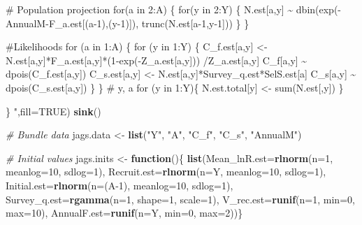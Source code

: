 \documentclass[
]{krantz}
\makeatletter
\newenvironment{Shaded}{\begin{snugshade}}{\end{snugshade}}
\newcommand{\AttributeTok}[1]{\textcolor[rgb]{0.27,0.27,0.27}{#1}}
\newcommand{\CommentTok}[1]{\textcolor[rgb]{0.37,0.37,0.37}{\textit{#1}}}
\newcommand{\ConstantTok}[1]{\textcolor[rgb]{0.37,0.37,0.37}{#1}}
\newcommand{\ControlFlowTok}[1]{\textcolor[rgb]{0.27,0.27,0.27}{\textbf{#1}}}
\newcommand{\DecValTok}[1]{\textcolor[rgb]{0.06,0.06,0.06}{#1}}
\newcommand{\FunctionTok}[1]{\textcolor[rgb]{0.27,0.27,0.27}{\textbf{#1}}}
\newcommand{\NormalTok}[1]{#1}
\newcommand{\OtherTok}[1]{\textcolor[rgb]{0.37,0.37,0.37}{#1}}
\newcommand{\StringTok}[1]{\textcolor[rgb]{0.5,0.5,0.5}{#1}}
\newenvironment{kframe}{%
\medskip{}
\setlength{\fboxsep}{.8em}
 \def\at@end@of@kframe{}%
 \ifinner\ifhmode%
  \def\at@end@of@kframe{\end{minipage}}%
  \begin{minipage}{\columnwidth}%
 \fi\fi%
 \def\FrameCommand##1{\hskip\@totalleftmargin \hskip-\fboxsep
 \colorbox{shadecolor}{##1}\hskip-\fboxsep
     \hskip-\linewidth \hskip-\@totalleftmargin \hskip\columnwidth}%
 \MakeFramed {\advance\hsize-\width
   \@totalleftmargin\z@ \linewidth\hsize
   \@setminipage}}%
 {\par\unskip\endMakeFramed%
 \at@end@of@kframe}
\renewenvironment{Shaded}{\begin{kframe}}{\end{kframe}}
\makeatother
\begin{document}
\begin{Shaded}
\begin{Highlighting}[]
\StringTok{    \# Population projection}
\StringTok{    for(a in 2:A) \{}
\StringTok{   for(y in 2:Y) \{}
\StringTok{     N.est[a,y] \textasciitilde{} dbin(exp({-}AnnualM{-}F\_a.est[(a{-}1),(y{-}1)]),}
\StringTok{                         trunc(N.est[a{-}1,y{-}1])) \} \}}

\StringTok{    \#Likelihoods}
\StringTok{    for (a in 1:A) \{}
\StringTok{   for (y in 1:Y) \{}
\StringTok{     C\_f.est[a,y] \textless{}{-} N.est[a,y]*F\_a.est[a,y]*(1{-}exp({-}Z\_a.est[a,y]))}
\StringTok{                      /Z\_a.est[a,y]}
\StringTok{     C\_f[a,y] \textasciitilde{} dpois(C\_f.est[a,y])}
\StringTok{     C\_s.est[a,y] \textless{}{-} N.est[a,y]*Survey\_q.est*SelS.est[a]}
\StringTok{     C\_s[a,y] \textasciitilde{} dpois(C\_s.est[a,y])}
\StringTok{   \} \} \# y, a}
\StringTok{   for (y in 1:Y)\{}
\StringTok{    N.est.total[y] \textless{}{-} sum(N.est[,y])}
\StringTok{   \}}

\StringTok{\}}
\StringTok{    "}\NormalTok{,}\AttributeTok{fill=}\ConstantTok{TRUE}\NormalTok{)}
\FunctionTok{sink}\NormalTok{()}

\CommentTok{\# Bundle data}
\NormalTok{jags.data }\OtherTok{\textless{}{-}} \FunctionTok{list}\NormalTok{(}\StringTok{"Y"}\NormalTok{, }\StringTok{"A"}\NormalTok{, }\StringTok{"C\_f"}\NormalTok{, }\StringTok{"C\_s"}\NormalTok{, }\StringTok{"AnnualM"}\NormalTok{)}

\CommentTok{\# Initial values}
\NormalTok{jags.inits }\OtherTok{\textless{}{-}} \ControlFlowTok{function}\NormalTok{()\{ }\FunctionTok{list}\NormalTok{(}\AttributeTok{Mean\_lnR.est=}\FunctionTok{rlnorm}\NormalTok{(}\AttributeTok{n=}\DecValTok{1}\NormalTok{, }\AttributeTok{meanlog=}\DecValTok{10}\NormalTok{, }
                                                   \AttributeTok{sdlog=}\DecValTok{1}\NormalTok{),}
                               \AttributeTok{Recruit.est=}\FunctionTok{rlnorm}\NormalTok{(}\AttributeTok{n=}\NormalTok{Y, }\AttributeTok{meanlog=}\DecValTok{10}\NormalTok{, }
                                                  \AttributeTok{sdlog=}\DecValTok{1}\NormalTok{),}
                               \AttributeTok{Initial.est=}\FunctionTok{rlnorm}\NormalTok{(}\AttributeTok{n=}\NormalTok{(A}\DecValTok{{-}1}\NormalTok{), }\AttributeTok{meanlog=}\DecValTok{10}\NormalTok{, }
                                                  \AttributeTok{sdlog=}\DecValTok{1}\NormalTok{),}
                               \AttributeTok{Survey\_q.est=}\FunctionTok{rgamma}\NormalTok{(}\AttributeTok{n=}\DecValTok{1}\NormalTok{, }\AttributeTok{shape=}\DecValTok{1}\NormalTok{, }
                                                   \AttributeTok{scale=}\DecValTok{1}\NormalTok{),}
                               \AttributeTok{V\_rec.est=}\FunctionTok{runif}\NormalTok{(}\AttributeTok{n=}\DecValTok{1}\NormalTok{, }\AttributeTok{min=}\DecValTok{0}\NormalTok{, }\AttributeTok{max=}\DecValTok{10}\NormalTok{),}
                               \AttributeTok{AnnualF.est=}\FunctionTok{runif}\NormalTok{(}\AttributeTok{n=}\NormalTok{Y, }\AttributeTok{min=}\DecValTok{0}\NormalTok{, }\AttributeTok{max=}\DecValTok{2}\NormalTok{))\}}


\end{Highlighting}
\end{Shaded}
\end{document}
